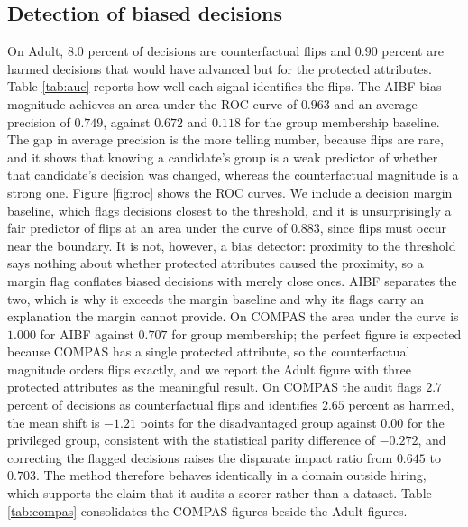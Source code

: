 \documentclass[conference]{IEEEtran}
\begin{document}
\subsection{Detection of biased decisions}
On Adult, $8.0$ percent of decisions are counterfactual flips and $0.90$ percent are
harmed decisions that would have advanced but for the protected attributes. Table
\ref{tab:auc} reports how well each signal identifies the flips. The AIBF bias
magnitude achieves an area under the ROC curve of $0.963$ and an average precision of
$0.749$, against $0.672$ and $0.118$ for the group membership baseline. The gap in
average precision is the more telling number, because flips are rare, and it shows
that knowing a candidate's group is a weak predictor of whether that candidate's
decision was changed, whereas the counterfactual magnitude is a strong one.
Figure \ref{fig:roc} shows the ROC curves. We include a decision margin baseline,
which flags decisions closest to the threshold, and it is unsurprisingly a fair
predictor of flips at an area under the curve of $0.883$, since flips must occur near
the boundary. It is not, however, a bias detector: proximity to the threshold says
nothing about whether protected attributes caused the proximity, so a margin flag
conflates biased decisions with merely close ones. AIBF separates the two, which
is why it exceeds the margin baseline and why its flags carry an explanation the margin
cannot provide. On COMPAS the area under the curve is
$1.000$ for AIBF against $0.707$ for group membership; the perfect figure is expected
because COMPAS has a single protected attribute, so the counterfactual magnitude
orders flips exactly, and we report the Adult figure with three protected attributes
as the meaningful result. On COMPAS the audit flags $2.7$ percent of decisions as
counterfactual flips and identifies $2.65$ percent as harmed, the mean shift is
$-1.21$ points for the disadvantaged group against $0.00$ for the privileged group,
consistent with the statistical parity difference of $-0.272$, and correcting the
flagged decisions raises the disparate impact ratio from $0.645$ to $0.703$. The
method therefore behaves identically in a domain outside hiring, which supports the
claim that it audits a scorer rather than a dataset. Table \ref{tab:compas}
consolidates the COMPAS figures beside the Adult figures.
\end{document}
